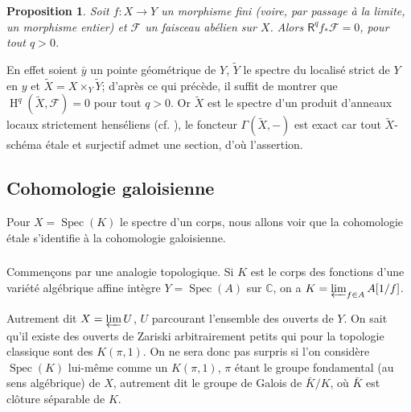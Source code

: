 \documentclass{book}
\DeclareMathOperator{\h}{H}
\DeclareMathOperator{\spec}{Spec}
\newcommand{\cF}{\mathcal{F}}
\newcommand{\dC}{\mathbb{C}}
\newcommand{\R}{\mathsf{R}}
\newtheorem{proposition}[subsubsection]{Proposition}
\begin{document}
\begin{proposition}\label{I:2-3-6}
Soit $f:X\to Y$ un morphisme fini (voire, par passage à la limite, un 
morphisme entier) et $\cF$ un faisceau abélien sur $X$. Alors $\R^q f_* \cF=0$, 
pour tout $q>0$.
\end{proposition}

En effet soient $\bar y$ un pointe géométrique de $Y$, $\widetilde Y$ le 
spectre du localisé strict de $Y$ en $y$ et 
$\widetilde X=X\times_Y \widetilde Y$; d'après ce qui précède, il suffit de 
montrer que $\h^q(\widetilde X,\cF) = 0$ pour tout $q>0$. Or $\widetilde X$ est le 
spectre d'un produit d'anneaux locaux strictement henséliens (cf. 
\cite[I]{11}), le foncteur $\Gamma(\widetilde X,-)$ est exact car tout 
$\widetilde X$-schéma étale et surjectif admet une section, d'où l'assertion. 










\subsection{Cohomologie galoisienne}\label{I:2-4}

Pour $X=\spec(K)$ le spectre d'un corps, nous allons voir que la cohomologie 
étale s'identifie à la cohomologie galoisienne. 





\subsubsection{}\label{I:2-4-1}

Commençons par une analogie topologique. Si $K$ est le corps des fonctions 
d'une variété algébrique affine intègre $Y=\spec(A)$ sur $\dC$, on a 
$K=\varprojlim_{f\in A} A[1/f]$. 

Autrement dit $X=\varprojlim U$, $U$ parcourant l'ensemble des ouverts de $Y$. 
On sait qu'il existe des ouverts de Zariski arbitrairement petits qui pour la 
topologie classique sont des $K(\pi,1)$. On ne sera donc pas surpris si l'on 
considère $\spec(K)$ lui-même comme un $K(\pi,1)$, $\pi$ étant le groupe 
fondamental (au sens algébrique) de $X$, autrement dit le groupe de Galois de 
$\bar K/K$, où $\bar K$ est clôture séparable de $K$. 





\subsubsection{}\label{I:2-4-2}
\end{document}
